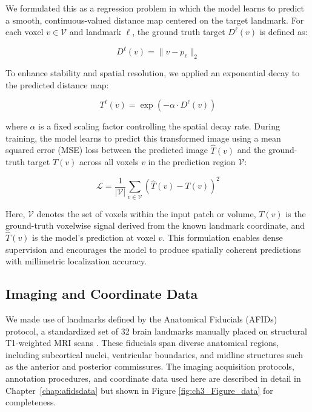 We formulated this as a regression problem in which the model learns to predict a smooth, continuous-valued distance map centered on the target landmark. For each voxel $v \in \mathcal{V}$ and landmark $\ell$, the ground truth target $D^\ell(v)$ is defined as:

\begin{equation}
D^\ell(v) = \lVert v - p_\ell \rVert_2
\end{equation}

To enhance stability and spatial resolution, we applied an exponential decay to the predicted distance map:

\begin{equation}
T^\ell(v) = \exp(-\alpha \cdot D^\ell(v))
\end{equation}

where $\alpha$ is a fixed scaling factor controlling the spatial decay rate. During training, the model learns to predict this transformed image using a mean squared error (MSE) loss between the predicted image \( \hat{T}(v) \) and the ground-truth target \( T(v) \) across all voxels \( v \) in the prediction region \( \mathcal{V} \):

\begin{equation}
\mathcal{L} = \frac{1}{|\mathcal{V}|} \sum_{v \in \mathcal{V}} \left( \hat{T}(v) - T(v) \right)^2
\end{equation}

Here, \( \mathcal{V} \) denotes the set of voxels within the input patch or volume, \( T(v) \) is the ground-truth voxelwise signal derived from the known landmark coordinate, and \( \hat{T}(v) \) is the model’s prediction at voxel \( v \). This formulation enables dense supervision and encourages the model to produce spatially coherent predictions with millimetric localization accuracy.


\subsection{Imaging and Coordinate Data}

We made use of landmarks defined by the Anatomical Fiducials (AFIDs) protocol, a standardized set of 32 brain landmarks manually placed on structural T1-weighted MRI scans \cite{Lau2019-eh}. These fiducials span diverse anatomical regions, including subcortical nuclei, ventricular boundaries, and midline structures such as the anterior and posterior commissures. The imaging acquisition protocols, annotation procedures, and coordinate data used here are described in detail in Chapter~\ref{chap:afidsdata} but shown in Figure \ref{fig:ch3_Figure_data} for completeness.

